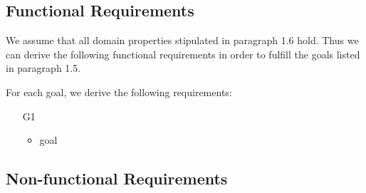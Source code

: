 
\subsection{Functional Requirements}
We assume that all domain properties stipulated in paragraph 1.6 hold. Thus we can derive the following functional requirements in order to fulfill the goals listed in paragraph 1.5.

For each goal, we derive the following requirements:

\begin{itemize}
	\item [G1]
		\begin{itemize}
			\item goal
		\end{itemize}
\end{itemize}



\subsection{Non-functional Requirements}
